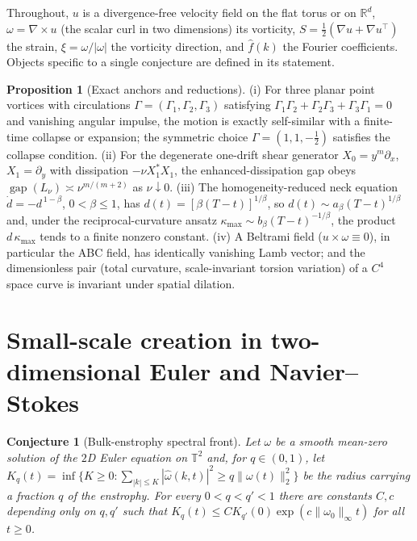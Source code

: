 \documentclass[11pt]{article}
\newtheorem{conjecture}{Conjecture}
\theoremstyle{definition}
\newtheorem{proposition}{Proposition}
\begin{document}
Throughout, $u$ is a divergence-free velocity field on the flat torus or on $\mathbb R^d$, $\omega=\nabla\times u$ (the scalar curl in two dimensions) its vorticity, $S=\tfrac12(\nabla u+\nabla u^\top)$ the strain, $\xi=\omega/|\omega|$ the vorticity direction, and $\hat f(k)$ the Fourier coefficients.  Objects specific to a single conjecture are defined in its statement.

\begin{proposition}[Exact anchors and reductions]\label{al:anchors}
{\rm(i)} For three planar point vortices with circulations $\Gamma=(\Gamma_1,\Gamma_2,\Gamma_3)$ satisfying $\Gamma_1\Gamma_2+\Gamma_2\Gamma_3+\Gamma_3\Gamma_1=0$ and vanishing angular impulse, the motion is exactly self-similar with a finite-time collapse or expansion; the symmetric choice $\Gamma=(1,1,-\tfrac12)$ satisfies the collapse condition.  {\rm(ii)} For the degenerate one-drift shear generator $X_0=y^m\partial_x$, $X_1=\partial_y$ with dissipation $-\nu X_1^\ast X_1$, the enhanced-dissipation gap obeys $\operatorname{gap}(L_\nu)\asymp\nu^{m/(m+2)}$ as $\nu\downarrow0$.  {\rm(iii)} The homogeneity-reduced neck equation $\dot d=-d^{\,1-\beta}$, $0<\beta\le1$, has $d(t)=[\beta(T-t)]^{1/\beta}$, so $d(t)\sim a_\beta(T-t)^{1/\beta}$ and, under the reciprocal-curvature ansatz $\kappa_{\max}\sim b_\beta(T-t)^{-1/\beta}$, the product $d\,\kappa_{\max}$ tends to a finite nonzero constant.  {\rm(iv)} A Beltrami field ($u\times\omega\equiv0$), in particular the ABC field, has identically vanishing Lamb vector; and the dimensionless pair (total curvature, scale-invariant torsion variation) of a $C^4$ space curve is invariant under spatial dilation.
\end{proposition}

\section{Small-scale creation in two-dimensional Euler and Navier--Stokes}

\begin{conjecture}[Bulk-enstrophy spectral front]\label{al1}
Let $\omega$ be a smooth mean-zero solution of the $2$D Euler equation on $\mathbb T^2$ and, for $q\in(0,1)$, let $K_q(t)=\inf\{K\ge0:\sum_{|k|\le K}|\hat\omega(k,t)|^2\ge q\|\omega(t)\|_2^2\}$ be the radius carrying a fraction $q$ of the enstrophy.  For every $0<q<q'<1$ there are constants $C,c$ depending only on $q,q'$ such that $K_q(t)\le CK_{q'}(0)\exp(c\|\omega_0\|_\infty t)$ for all $t\ge0$.
\end{conjecture}
\end{document}

